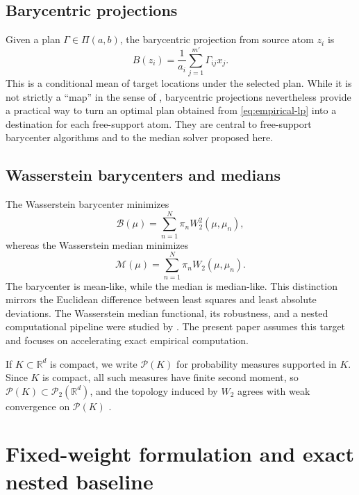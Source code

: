 \documentclass[pdflatex,sn-mathphys-ay]{sn-jnl}%
\theoremstyle{thmstyleone}%
\theoremstyle{thmstyletwo}%
\theoremstyle{thmstylethree}%
\newcommand{\R}{\mathbb R}
\newcommand{\calP}{\mathcal P}
\newcommand{\calM}{\mathcal M}
\newcommand{\calB}{\mathcal B}
\begin{document}
\subsection{Barycentric projections}

Given a plan \(\Gamma\in\Pi(a,b)\), the barycentric projection from source atom \(z_i\) is
\[
    B(z_i)=\frac{1}{a_i}\sum_{j=1}^{m'}\Gamma_{ij}x_j.
\]
This is a conditional mean of target locations under the selected plan. While it is not strictly a ``map'' in the sense of \citet{monge_1781_MemoireTheorieDeblais}, barycentric projections nevertheless provide a practical way to turn an optimal plan obtained from \eqref{eq:empirical-lp} into a destination for each free-support atom. They are central to free-support barycenter algorithms \citep{cuturi_2014_FastComputationWasserstein, alvarez-esteban_2016_FixedpointApproachBarycenters} and to the median solver proposed here.



\subsection{Wasserstein barycenters and medians}

The Wasserstein barycenter minimizes
\[
    \calB(\mu)=\sum_{n=1}^N \pi_n W_2^2(\mu,\mu_n),
\]
whereas the Wasserstein median minimizes
\begin{equation}\label{eq:population-median}
    \calM(\mu)=\sum_{n=1}^N \pi_n W_2(\mu,\mu_n).
\end{equation}
The barycenter is mean-like, while the median is median-like. This distinction mirrors the Euclidean difference between least squares and least absolute deviations. The Wasserstein median functional, its robustness, and a nested computational pipeline were studied by \citet{you_2025_WassersteinMedianProbability}. The present paper assumes this target and focuses on accelerating exact empirical computation.

If \(K\subset\R^d\) is compact, we write \(\calP(K)\) for probability measures supported in \(K\). Since \(K\) is compact, all such measures have finite second moment, so \(\calP(K)\subset\calP_2(\R^d)\), and the topology induced by \(W_2\) agrees with weak convergence on \(\calP(K)\) \citep{villani_2003_TopicsOptimalTransportation, panaretos_2020_InvitationStatisticsWasserstein}.



\section{Fixed-weight formulation and exact nested baseline}\label{sec:formulation}
\end{document}
